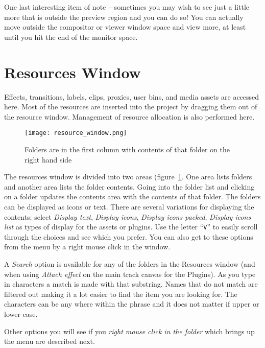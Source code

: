 One last interesting item of note -- sometimes you may wish to see just a little more that is outside the preview region and you can do so!  You can actually move outside the compositor or viewer window space and view more, at least until you hit the end of the monitor space.

\section{Resources Window}%
\label{sec:resources_window}

Effects, transitions, labels, clips, proxies, user bins, and media assets are accessed here. 
Most of the resources are inserted into the project by dragging them out of the resource window. 
Management of resource allocation is also performed here.

\begin{figure}[htpb]
    \centering
    \texttt{[image: resource\_window.png]}
    \caption{Folders are in the first column with contents of that folder on the right hand side}
    \label{fig:resource_window}
\end{figure}

The resources window is divided into two areas (figure~\ref{fig:resource_window}. 
One area lists folders and another area lists the folder contents. 
Going into the folder list and clicking on a folder updates the contents area with the contents of that folder. 
The folders can be displayed as icons or text. 
There are several variations for displaying the contents; select \emph{Display text}, \emph{Display icons}, \emph{Display icons packed}, \emph{Display icons list} as types of display for the assets or plugins. 
Use the letter “\texttt{V}” to easily scroll through the choices and see which you prefer.  
You can also get to these options from the menu by a right mouse click in the window.

A \emph{Search} option is available for any of the folders in the Resources window (and when using \textit{Attach effect} on the main track canvas for the Plugins).  
As you type in characters a match is made with that substring.  
Names that do not match are filtered out making it a lot easier to find the item you are looking for.  
The characters can be any where within the phrase and it does not matter if upper or lower case. 

Other options you will see if you \textit{right mouse click in the folder} which brings up the menu are described next.  

